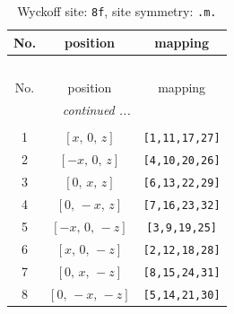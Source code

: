 \documentclass[fleqn,8pt]{jsarticle}
\begin{document}
\begin{longtable}{ccc}
\caption{Wyckoff site: {\tt 8f}, site symmetry: {\tt .m.}}
 \\
 \hline \hline
No. & position & mapping \\ \hline \endfirsthead

\multicolumn{2}{l}{\tablename\ \thetable{}} \\
 \hline \hline
No. & position & mapping \\ \hline \endhead

 \hline \hline
\multicolumn{2}{r}{\footnotesize\it continued ...} \\ \endfoot

 \hline \hline
\multicolumn{2}{r}{} \\ \endlastfoot

1 & $\left[ x,\, 0,\, z \right]$ & {\tt [1,11,17,27]} \\ \hline
2 & $\left[ - x,\, 0,\, z \right]$ & {\tt [4,10,20,26]} \\ \hline
3 & $\left[ 0,\, x,\, z \right]$ & {\tt [6,13,22,29]} \\ \hline
4 & $\left[ 0,\, - x,\, z \right]$ & {\tt [7,16,23,32]} \\ \hline
5 & $\left[ - x,\, 0,\, - z \right]$ & {\tt [3,9,19,25]} \\ \hline
6 & $\left[ x,\, 0,\, - z \right]$ & {\tt [2,12,18,28]} \\ \hline
7 & $\left[ 0,\, x,\, - z \right]$ & {\tt [8,15,24,31]} \\ \hline
8 & $\left[ 0,\, - x,\, - z \right]$ & {\tt [5,14,21,30]} \\
\end{longtable}
\renewcommand{\arraystretch}{1.2}
\end{document}
